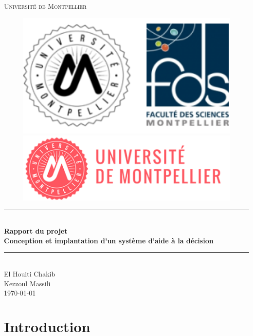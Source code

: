 \documentclass[12pt,titlepage]{article}
\begin{document}
\begin{titlepage}
\newcommand{\HRule}{\rule{\linewidth}{0.5mm}}
\center
\textsc{\LARGE
Université de Montpellier
} \\[1cm]
\begin{figure}[h]
	\begin{minipage}[c]{.46\linewidth}
		\centering
		\includegraphics[width=1\textwidth]{img/fds.png}
	\end{minipage}
	\hfill%
	\begin{minipage}[c]{.46\linewidth}
		\centering
		\includegraphics[width=1\textwidth]{img/univ-montpellier.png}
	\end{minipage}
\end{figure}

\HRule \\[0.4cm]
{ \huge \bfseries Rapport du projet \\Conception et implantation d’un système d’aide à la décision }
\HRule \\[1.5cm]
El Houiti Chakib \\
Kezzoul Massili
\\[1cm]
\today \\ [1cm]
\end{titlepage}

\section*{Introduction}
\end{document}
